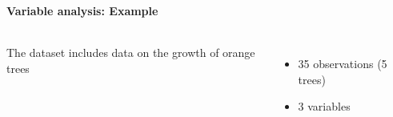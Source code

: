 \documentclass[8pt]{beamer}
\begin{document}
\begin{frame}[fragile]
\frametitle{\insertsection}
\framesubtitle{Variable analysis: Example}

\begin{columns}[c]

\begin{minipage}[c][.5\textheight][c]{\linewidth}

The {\color{blue}{Orange}} dataset includes data on the growth of orange trees
\begin{itemize}
\item 35 observations (5 trees)
\item 3 variables
\end{itemize}

\medskip
\medskip


\end{minipage}	   



\end{columns}
\end{frame}
\end{document}
